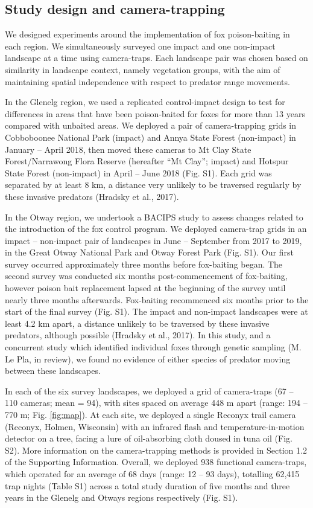 \documentclass[]{elsarticle} %
\begin{document}
\hypertarget{study-design-and-camera-trapping}{%
\subsection{Study design and camera-trapping}\label{study-design-and-camera-trapping}}

We designed experiments around the implementation of fox poison-baiting in each region. We simultaneously surveyed one impact and one non-impact landscape at a time using camera-traps.
Each landscape pair was chosen based on similarity in landscape context, namely vegetation groups, with the aim of maintaining spatial independence with respect to predator range movements.

In the Glenelg region, we used a replicated control-impact design to test for differences in areas that have been poison-baited for foxes for more than 13 years compared with unbaited areas.
We deployed a pair of camera-trapping grids in Cobboboonee National Park (impact) and Annya State Forest (non-impact) in January -- April 2018, then moved these cameras to Mt Clay State Forest/Narrawong Flora Reserve (hereafter ``Mt Clay''; impact) and Hotspur State Forest (non-impact) in April -- June 2018 (Fig. S1).
Each grid was separated by at least 8 km, a distance very unlikely to be traversed regularly by these invasive predators (Hradsky et al., 2017).

In the Otway region, we undertook a BACIPS study to assess changes related to the introduction of the fox control program.
We deployed camera-trap grids in an impact -- non-impact pair of landscapes in June -- September from 2017 to 2019, in the Great Otway National Park and Otway Forest Park (Fig. S1).
Our first survey occurred approximately three months before fox-baiting began.
The second survey was conducted six months post-commencement of fox-baiting, however poison bait replacement lapsed at the beginning of the survey until nearly three months afterwards. Fox-baiting recommenced six months prior to the start of the final survey (Fig. S1).
The impact and non-impact landscapes were at least 4.2 km apart, a distance unlikely to be traversed by these invasive predators, although possible (Hradsky et al., 2017).
In this study, and a concurrent study which identified individual foxes through genetic sampling (M. Le Pla, in review), we found no evidence of either species of predator moving between these landscapes.

In each of the six survey landscapes, we deployed a grid of camera-traps (67 -- 110 cameras; mean = 94), with sites spaced on average 448 m apart (range: 194 -- 770 m; Fig. \ref{fig:map}).
At each site, we deployed a single Reconyx trail camera (Reconyx, Holmen, Wisconsin) with an infrared flash and temperature-in-motion detector on a tree, facing a lure of oil-absorbing cloth doused in tuna oil (Fig. S2).
More information on the camera-trapping methods is provided in Section 1.2 of the Supporting Information.
Overall, we deployed 938 functional camera-traps, which operated for an average of 68 days (range: 12 -- 93 days), totalling 62,415 trap nights (Table S1) across a total study duration of five months and three years in the Glenelg and Otways regions respectively (Fig. S1).
\end{document}
